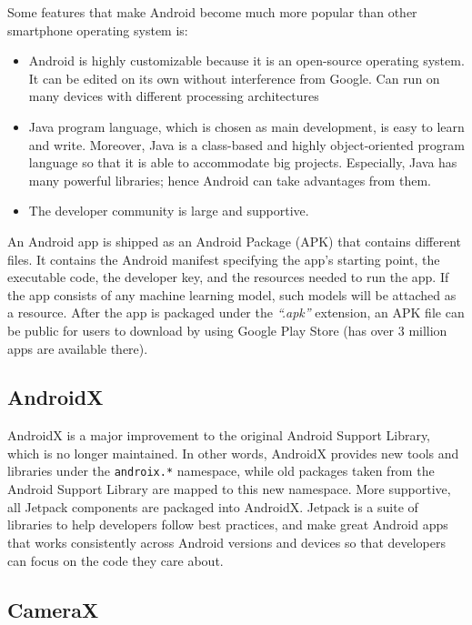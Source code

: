 \noindent Some features that make Android become much more popular than other smartphone operating system is:
\begin{itemize}
    \item 
	Android is highly customizable because it is an open-source operating system. It can be edited on its own without interference from Google. Can run on many devices with different processing architectures
\item	Java program language, which is chosen as main development, is easy to learn and write. Moreover, Java is a class-based and highly object-oriented program language so that it is able to accommodate big projects. Especially, Java has many powerful libraries; hence Android can take advantages from them.
\item	The developer community is large and supportive.
\end{itemize}

An Android app is shipped as an Android Package (APK) that contains different files. It contains the Android manifest specifying the app’s starting point, the executable code, the developer key, and the resources needed to run the app. If the app consists of any machine learning model, such models will be attached as a resource. After the app is packaged under the \emph{“.apk”} extension, an APK file can be public for users to download by using Google Play Store (has over 3 million apps are available there). \par

\subsection{AndroidX} \label{sec:androidx}

AndroidX is a major improvement to the original Android Support Library, which is no longer maintained. In other words, AndroidX provides new tools and libraries under the \verb|androix.*| namespace, while old packages taken from the Android Support Library are mapped to this new namespace. 
More supportive, all Jetpack components are packaged into AndroidX. Jetpack is a suite of libraries to help developers follow best practices, and make great Android apps that works consistently across Android versions and devices so that developers can focus on the code they care about. \par

\subsection{CameraX} \label{sec:camerax}

